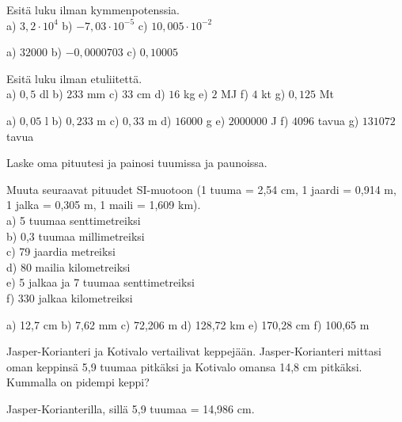 \begin{tehtava}
Esitä luku ilman kymmenpotenssia. \\
a) $3,2 \cdot 10^4$ \qquad
b) $-7,03 \cdot 10^{-5}$ \qquad
c) $10,005 \cdot 10^{-2}$ \qquad
\begin{vastaus}
a) $32000$ \qquad
b) $-0,0000703$ \qquad
c) $0,10005$ \qquad
\end{vastaus}
\end{tehtava}


\begin{tehtava}
Esitä luku ilman etuliitettä. \\
a) $0,5$ dl \qquad
b) $233$ mm \qquad
c) $33$ cm \qquad
d) $16$ kg \qquad
e) $2$ MJ \qquad
f) $4$ kt \qquad
g) $0,125$ Mt
\begin{vastaus}
a) $0,05$ l \qquad
b) $0,233$ m \qquad
c) $0,33$ m \qquad
d) $16 000$ g \qquad
e) $2 000 000$ J \qquad
f) $4096$ tavua \qquad
g) $131072$ tavua
\end{vastaus}
\end{tehtava}

\begin{tehtava}
Laske oma pituutesi ja painosi tuumissa ja paunoissa.
\end{tehtava}

\begin{tehtava}
Muuta seuraavat pituudet SI-muotoon (1 tuuma = 2,54 cm, 1 jaardi = 0,914 m, 1 jalka = 0,305 m, 1 maili = 1,609 km). \\
a) 5 tuumaa senttimetreiksi \\
b) 0,3 tuumaa millimetreiksi \\
c) 79 jaardia metreiksi \\
d) 80 mailia kilometreiksi \\
e) 5 jalkaa ja 7 tuumaa senttimetreiksi \\
f) 330 jalkaa kilometreiksi
\begin{vastaus}
a) 12,7 cm \qquad
b) 7,62 mm \qquad
c) 72,206 m \qquad
d) 128,72 km \qquad
e) 170,28 cm \qquad
f) 100,65 m
\end{vastaus}
\end{tehtava}

\begin{tehtava}
Jasper-Korianteri ja Kotivalo vertailivat keppejään. Jasper-Korianteri mittasi oman keppinsä 5,9 tuumaa pitkäksi ja Kotivalo omansa 14,8 cm pitkäksi. Kummalla on pidempi keppi?
\begin{vastaus}
Jasper-Korianterilla, sillä 5,9 tuumaa = 14,986 cm.
\end{vastaus}
\end{tehtava}

